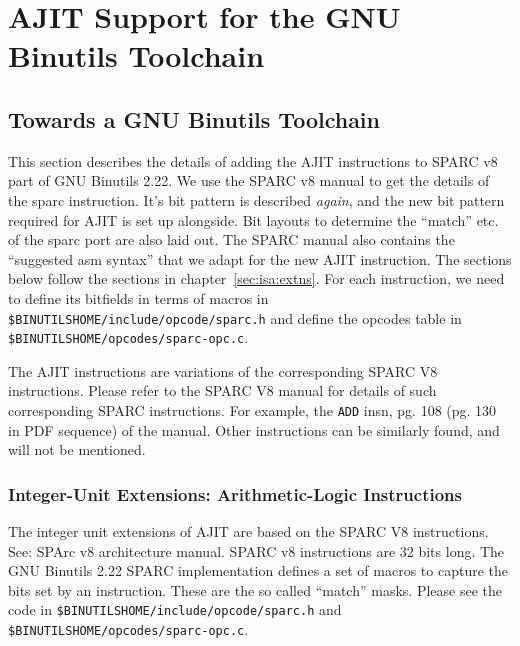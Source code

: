 \chapter{AJIT Support for the GNU Binutils Toolchain}
\label{chap:amv:work}

\section{Towards a GNU Binutils Toolchain}
\label{sec:binutils:support}

This section describes the details  of adding the AJIT instructions to
SPARC v8 part of GNU Binutils 2.22.  We use the SPARC v8 manual to get
the details of  the sparc instruction.  It's bit  pattern is described
\emph{again}, and  the new  bit pattern  required for  AJIT is  set up
alongside.  Bit layouts to determine  the ``match'' etc.  of the sparc
port  are  also  laid  out.    The  SPARC  manual  also  contains  the
``suggested asm syntax''  that we adapt for the  new AJIT instruction.
The sections below follow the sections in chapter~\ref{sec:isa:extns}.
For each  instruction, we  need to  define its  bitfields in  terms of
macros  in  \texttt{\$BINUTILSHOME/include/opcode/sparc.h} and  define
the opcodes table in \texttt{\$BINUTILSHOME/opcodes/sparc-opc.c}.

The AJIT  instructions are  variations of  the corresponding  SPARC V8
instructions.  Please refer to the SPARC V8 manual for details of such
corresponding SPARC instructions. For  example, the \texttt{ADD} insn,
pg. 108 (pg.  130 in PDF  sequence) of the manual.  Other instructions
can be similarly found, and will not be mentioned.

\subsection{Integer-Unit Extensions: Arithmetic-Logic Instructions}
\label{sec:integer-unit-extns:arith-logic-insns:impl}

The  integer  unit extensions  of  AJIT  are  based  on the  SPARC  V8
instructions.    See:  SPArc   v8  architecture   manual.   SPARC   v8
instructions  are  32   bits  long.   The  GNU   Binutils  2.22  SPARC
implementation defines a  set of macros to capture the  bits set by an
instruction.  These are the so called ``match'' masks.  Please see the
code     in     \texttt{\$BINUTILSHOME/include/opcode/sparc.h}     and
\texttt{\$BINUTILSHOME/opcodes/sparc-opc.c}.
\vfill
\newpage






